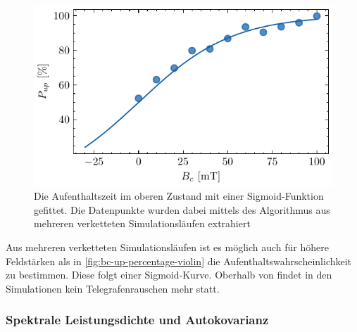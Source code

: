 \documentclass[main.tex]{subfiles}
\begin{document}
\begin{figure}[H]
    \centering
    \includegraphics{bilder/plots/max_Bz/up_percentage_fit.pdf}
    \caption{Die Aufenthaltszeit im oberen Zustand mit einer Sigmoid-Funktion gefittet. Die Datenpunkte wurden dabei mittels des Algorithmus aus mehreren verketteten Simulationsläufen extrahiert}\label{fig:bc-up-percentage}
\end{figure}

Aus mehreren verketteten Simulationsläufen ist es möglich auch für höhere Feldstärken als in \cref{fig:bc-up-percentage-violin} die Aufenthaltswahrscheinlichkeit zu bestimmen. Diese folgt einer Sigmoid-Kurve. Oberhalb von  findet in den Simulationen kein Telegrafenrauschen mehr statt.


\subsubsection{Spektrale Leistungsdichte und Autokovarianz}

\end{document}
